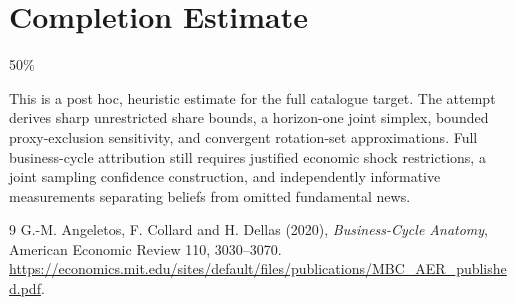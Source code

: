 \documentclass[11pt,a4paper]{article}
\begin{document}
\section{Completion Estimate}
50\%

This is a post hoc, heuristic estimate for the full catalogue target.
The attempt derives sharp unrestricted share bounds, a horizon-one joint simplex, bounded proxy-exclusion sensitivity, and convergent rotation-set approximations. Full business-cycle attribution still requires justified economic shock restrictions, a joint sampling confidence construction, and independently informative measurements separating beliefs from omitted fundamental news.

\begin{thebibliography}{9}
 G.-M. Angeletos, F. Collard and H. Dellas (2020), \emph{Business-Cycle Anatomy}, American Economic Review 110, 3030--3070. \url{https://economics.mit.edu/sites/default/files/publications/MBC_AER_published.pdf}.
\end{thebibliography}
\end{document}
